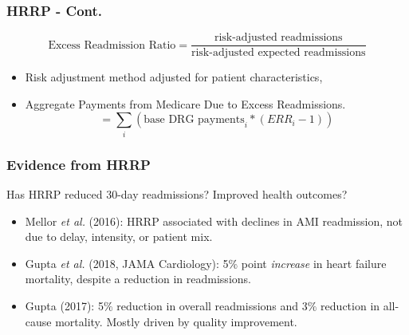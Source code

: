 \documentclass[ucs,9pt]{beamer}
\begin{document}
\begin{frame}
\frametitle{HRRP - Cont.}
\begin{displaymath}
\mbox{Excess Readmission Ratio} = \frac{\mbox{risk-adjusted readmissions}}{\mbox{risk-adjusted expected readmissions}}
\end{displaymath}
\begin{itemize}
\item Risk adjustment method adjusted for patient characteristics, %
\item Aggregate Payments from Medicare Due to Excess Readmissions.   
\begin{displaymath}
= \sum_{i} (\mbox{base DRG payments}_{i} * (ERR_{i}-1))
\end{displaymath}


\end{itemize}

\end{frame}








\begin{frame}
\frametitle{Evidence from HRRP}
Has HRRP reduced 30-day readmissions?  Improved health outcomes?
\begin{itemize}

\item Mellor \textit{et al.} (2016): HRRP associated with declines in AMI readmission, not due to delay, intensity, or patient mix. 

\item Gupta \textit{et al.} (2018, JAMA Cardiology): 5$\%$ point \textit{increase} in heart failure mortality, despite a reduction in readmissions. 

\item Gupta (2017): 5$\%$ reduction in overall readmissions and 3$\%$ reduction in all-cause mortality. Mostly driven by quality improvement.
\end{itemize}
\end{frame}
\end{document}

